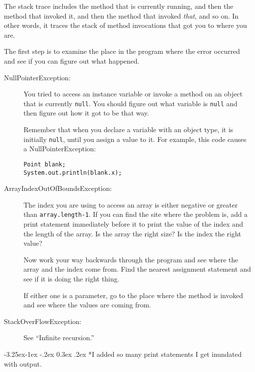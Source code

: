 \documentclass{book}
\makeatletter
\renewcommand\subsection{\@startsection {subsection}{2}{0mm}%
    {-3.25ex\@plus -1ex \@minus -.2ex}%
    {0.3ex \@plus .2ex}%
    {\normalfont\large\bfseries}}
\makeatother
\begin{document}
The stack trace includes the method that is currently running,
and then the method that invoked it, and then the method that
invoked {\em that}, and so on.  In other words, it traces the
stack of method invocations that got you to where you are.

The first step is to examine the place in the program where
the error occurred and see if you can figure out what happened.

\begin{description}

\item[NullPointerException:] You tried to access an instance
variable or invoke a method on an object that is currently
{\tt null}.  You should figure out what variable is {\tt null}
and then figure out how it got to be that way.

Remember that when you declare a variable with an object type,
it is initially {\tt null}, until you assign a value to it.
For example, this code causes a NullPointerException:

\begin{verbatim}
Point blank;
System.out.println(blank.x);
\end{verbatim}

\item[ArrayIndexOutOfBoundsException:] The index you are using
to access an array is either negative or greater than
{\tt array.length-1}.  If you can find the site where the
problem is, add a print statement immediately before it to
print the value of the index and the length of the array.
Is the array the right size?  Is the index the right value?

Now work your way backwards through the program and see where
the array and the index come from.  Find the nearest assignment
statement and see if it is doing the right thing.

If either one is a parameter, go to the place where the method
is invoked and see where the values are coming from.

\item[StackOverFlowException:] See ``Infinite recursion.''

\end{description}


\subsection*{I added so many print statements I get inundated with
output.}
\end{document}
